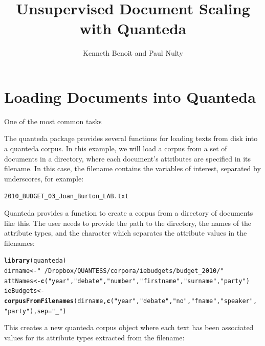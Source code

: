 \documentclass{article}\usepackage[]{graphicx}\usepackage[]{color}
\makeatletter
\newcommand{\hlstr}[1]{\textcolor[rgb]{0.192,0.494,0.8}{#1}}%
\newcommand{\hlstd}[1]{\textcolor[rgb]{0.345,0.345,0.345}{#1}}%
\newcommand{\hlkwb}[1]{\textcolor[rgb]{0.69,0.353,0.396}{#1}}%
\newcommand{\hlkwc}[1]{\textcolor[rgb]{0.333,0.667,0.333}{#1}}%
\newcommand{\hlkwd}[1]{\textcolor[rgb]{0.737,0.353,0.396}{\textbf{#1}}}%
\newenvironment{kframe}{%
 \def\at@end@of@kframe{}%
 \ifinner\ifhmode%
  \def\at@end@of@kframe{\end{minipage}}%
  \begin{minipage}{\columnwidth}%
 \fi\fi%
 \def\FrameCommand##1{\hskip\@totalleftmargin \hskip-\fboxsep
 \colorbox{shadecolor}{##1}\hskip-\fboxsep
     \hskip-\linewidth \hskip-\@totalleftmargin \hskip\columnwidth}%
 \MakeFramed {\advance\hsize-\width
   \@totalleftmargin\z@ \linewidth\hsize
   \@setminipage}}%
 {\par\unskip\endMakeFramed%
 \at@end@of@kframe}
\newenvironment{knitrout}{}{} %
\makeatother
\begin{document}
\title{Unsupervised Document Scaling with Quanteda}


\author{Kenneth Benoit and Paul Nulty}

\maketitle

\section*{Loading Documents into Quanteda}

One of the most common tasks 

The quanteda package provides several functions for loading texts from disk into a quanteda corpus. In this example, we will load a corpus from a set of documents in a directory, where each document's attributes are specified in its filename. In this case, the filename contains the variables of interest, separated by underscores, for example:

\texttt{2010\_BUDGET\_03\_Joan\_Burton\_LAB.txt}

Quanteda provides a function to create a corpus from a directory of documents like this. The user needs to provide the path to the directory, the names of the attribute types, and the character which separates the attribute values in the filenames:

\begin{knitrout}
\color{fgcolor}\begin{kframe}
\begin{alltt}
\hlkwd{library}\hlstd{(quanteda)}
\hlstd{dirname} \hlkwb{<-} \hlstr{"~/Dropbox/QUANTESS/corpora/iebudgets/budget_2010/"}
\hlstd{attNames} \hlkwb{<-} \hlkwd{c}\hlstd{(}\hlstr{"year"}\hlstd{,} \hlstr{"debate"}\hlstd{,} \hlstr{"number"}\hlstd{,} \hlstr{"firstname"}\hlstd{,} \hlstr{"surname"}\hlstd{,} \hlstr{"party"}\hlstd{)}
\hlstd{ieBudgets} \hlkwb{<-} \hlkwd{corpusFromFilenames}\hlstd{(dirname,} \hlkwd{c}\hlstd{(}\hlstr{"year"}\hlstd{,} \hlstr{"debate"}\hlstd{,} \hlstr{"no"}\hlstd{,} \hlstr{"fname"}\hlstd{,} \hlstr{"speaker"}\hlstd{,}
    \hlstr{"party"}\hlstd{),} \hlkwc{sep} \hlstd{=} \hlstr{"_"}\hlstd{)}
\end{alltt}
\end{kframe}
\end{knitrout}



This creates a new quanteda corpus object where each text has been associated values for its attribute types extracted from the filename:
\end{document}
